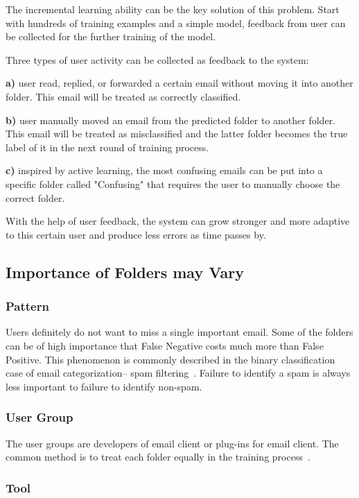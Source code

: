 \documentclass{sig-alternate-05-2015}
\begin{document}
The incremental learning ability can be the key solution of this problem. Start with hundreds of training examples and a simple model, feedback from user can be collected for the further training of the model.

Three types of user activity can be collected as feedback to the system: 

\textbf{a)} user read, replied, or forwarded a certain email without moving it into another folder. This email will be treated as correctly classified.

\textbf{b)} user manually moved an email from the predicted folder to another folder. This email will be treated as misclassified and the latter folder becomes the true label of it in the next round of training process.

\textbf{c)} inspired by active learning, the most confusing emails can be put into a specific folder called "Confusing" that requires the user to manually choose the correct folder.

With the help of user feedback, the system can grow stronger and more adaptive to this certain user and produce less errors as time passes by.


\subsection{Importance of Folders may Vary}

\subsubsection{Pattern}

Users definitely do not want to miss a single important email. Some of the folders can be of high importance that False Negative costs much more than False Positive. This phenomenon is commonly described in the binary classification case of email categorization-- spam filtering~\cite{cormack2007email}. Failure to identify a spam is always less important to failure to identify non-spam.

\subsubsection{User Group}

The user groups are developers of email client or plug-ins for email client. The common method is to treat each folder equally in the training process~\cite{bekkerman2004automatic}. 

\subsubsection{Tool}
\end{document}
